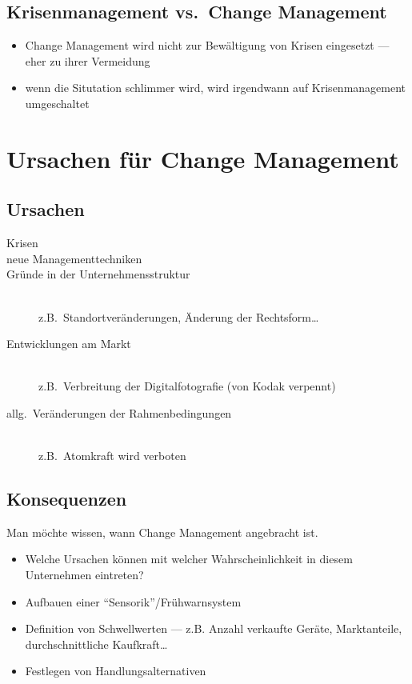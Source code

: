 \documentclass[a4paper, 12pt]{article}
\begin{document}
\subsection{Krisenmanagement vs.\ Change Management}
\begin{itemize}
  \item Change Management wird nicht zur Bewältigung von Krisen eingesetzt --- eher zu ihrer Vermeidung
  \item wenn die Situtation schlimmer wird, wird irgendwann auf Krisenmanagement umgeschaltet
\end{itemize}


\section[Ursachen]{Ursachen für Change Management}


\subsection{Ursachen}
\begin{description}
  \item[Krisen]
  \item[neue Managementtechniken]
  \item[Gründe in der Unternehmensstruktur]~\\
    z.B.\ Standortveränderungen, Änderung der Rechtsform\ldots
  \item[Entwicklungen am Markt]~\\
    z.B.\ Verbreitung der Digitalfotografie (von Kodak verpennt)
  \item[allg.\ Veränderungen der Rahmenbedingungen]~\\
    z.B.\ Atomkraft wird verboten
\end{description}


\subsection{Konsequenzen}
Man möchte wissen, wann Change Management angebracht ist.
\begin{itemize}
  \item Welche Ursachen können mit welcher Wahrscheinlichkeit in diesem Unternehmen eintreten?
  \item Aufbauen einer ``Sensorik''/Frühwarnsystem
  \item Definition von Schwellwerten --- z.B. Anzahl verkaufte Geräte, Marktanteile, durchschnittliche Kaufkraft\ldots
  \item Festlegen von Handlungsalternativen
\end{itemize}
\end{document}
